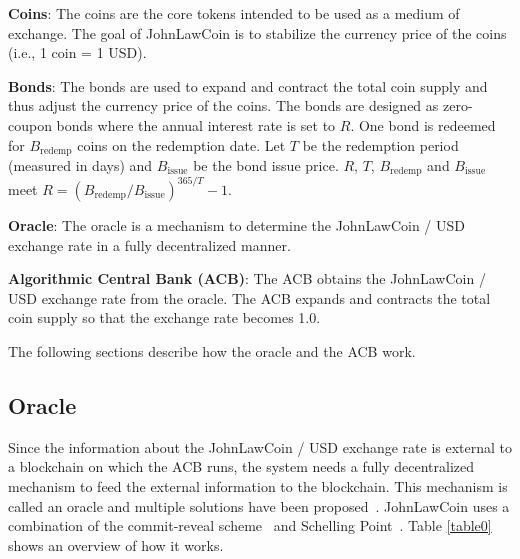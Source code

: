\documentclass[dvipdfmx,a4paper]{article}
\begin{document}
\begin{description}
\item{\textbf{Coins}}: The coins are the core tokens intended to be used as a medium of exchange. The goal of JohnLawCoin is to stabilize the currency price of the coins (i.e., 1 coin = 1 USD).
\item{\textbf{Bonds}}: The bonds are used to expand and contract the total coin supply and thus adjust the currency price of the coins. The bonds are designed as zero-coupon bonds where the annual interest rate is set to $R$. One bond is redeemed for $B_{\mathrm{redemp}}$ coins on the redemption date. Let $T$ be the redemption period (measured in days) and $B_{\mathrm{issue}}$ be the bond issue price. $R$, $T$, $B_{\mathrm{redemp}}$ and $B_{\mathrm{issue}}$ meet $R=(B_{\mathrm{redemp}}/B_{\mathrm{issue}})^{365/T}-1$.
\item{\textbf{Oracle}}: The oracle is a mechanism to determine the JohnLawCoin / USD exchange rate in a fully decentralized manner.
\item{\textbf{Algorithmic Central Bank (ACB)}}: The ACB obtains the JohnLawCoin / USD exchange rate from the oracle. The ACB expands and contracts the total coin supply so that the exchange rate becomes 1.0.
\end{description}

The following sections describe how the oracle and the ACB work.

\subsection{Oracle}

Since the information about the JohnLawCoin / USD exchange rate is external to a blockchain on which the ACB runs, the system needs a fully decentralized mechanism to feed the external information to the blockchain. This mechanism is called an oracle and multiple solutions have been proposed~\cite{chainlink,adler2018astraea}. JohnLawCoin uses a combination of the commit-reveal scheme~\cite{wohrer2018design} and Schelling Point~\cite{shellingpoint}. Table \ref{table0} shows an overview of how it works.
\end{document}
